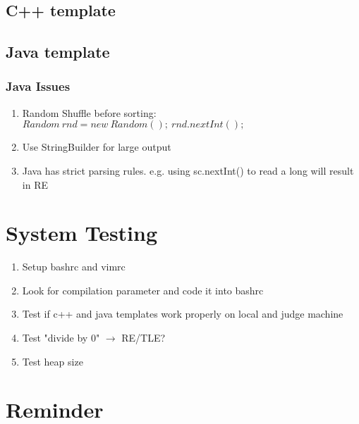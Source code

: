 \documentclass[10pt,oneside]{article}
\begin{document}
\begin{landscape}
\begin{multicols}{2}
\subsection{C++ template}


\subsection{Java template}


\subsubsection{Java Issues}
\begin{enumerate}
	\item Random Shuffle before sorting: $Random\ rnd = new\ Random();\ rnd.nextInt();$
	\item Use StringBuilder for large output
	\item Java has strict parsing rules. e.g. using sc.nextInt() to read a long will result in RE
\end{enumerate}

\section{System Testing}

\begin{enumerate}
	\item Setup bashrc and vimrc
	\item Look for compilation parameter and code it into bashrc
	\item Test if c++ and java templates work properly on local and judge machine
	\item Test "divide by 0" $\rightarrow$ RE/TLE?
	\item Test heap size
\end{enumerate}


\section{Reminder}


\end{multicols}
\end{landscape}
\end{document}
